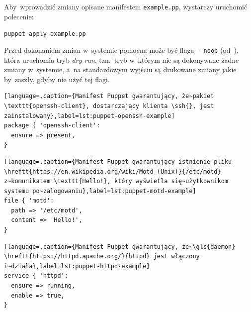 \documentclass[thesis]{subfiles}
\begin{document}
Aby~wprowadzić zmiany opisane manifestem \texttt{example.pp}, wystarczy uruchomić polecenie:\mynobreakpar
\begin{center}
	\texttt{puppet apply example.pp}
\end{center}

Przed dokonaniem zmian w~systemie pomocna może być flaga \texttt{-{}-noop} (od~), która uruchomia tryb \emph{dry run}, tzn.~tryb w~którym nie są dokonywane żadne zmiany w~systemie, a~na standardowym wyjściu są drukowane zmiany jakie by~zaszły, gdyby nie użyć tej flagi.

\begin{minipage}{\linewidth} %
\begin{lstlisting}[language=,caption={Manifest Puppet gwarantujący, że~pakiet \texttt{openssh-client}, dostarczający klienta \ssh{}, jest zainstalowany},label=lst:puppet-openssh-example]
package { 'openssh-client':
  ensure => present,
}
\end{lstlisting}
\end{minipage}

\begin{lstlisting}[language=,caption={Manifest Puppet gwarantujący istnienie pliku \hreftt{https://en.wikipedia.org/wiki/Motd_(Unix)}{/etc/motd} z~komunikatem \texttt{Hello!}, który wyświetla się~użytkownikom systemu po~zalogowaniu},label=lst:puppet-motd-example]
file { 'motd':
  path => '/etc/motd',
  content => 'Hello!',
}
\end{lstlisting}

\begin{lstlisting}[language=,caption={Manifest Puppet gwarantujący, że~\gls{daemon} \hreftt{https://httpd.apache.org/}{httpd} jest włączony i~działa},label=lst:puppet-httpd-example]
service { 'httpd':
  ensure => running,
  enable => true,
}
\end{lstlisting}
\end{document}
